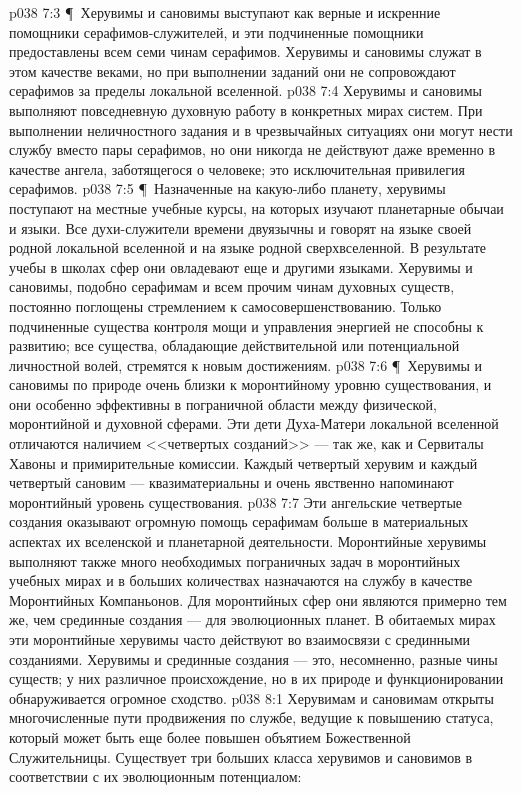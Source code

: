 \vs p038 7:3 \P\ Херувимы и сановимы выступают как верные и искренние помощники серафимов\hyp{}служителей, и эти подчиненные помощники предоставлены всем семи чинам серафимов. Херувимы и сановимы служат в этом качестве веками, но при выполнении заданий они не сопровождают серафимов за пределы локальной вселенной.
\vs p038 7:4 Херувимы и сановимы выполняют повседневную духовную работу в конкретных мирах систем. При выполнении неличностного задания и в чрезвычайных ситуациях они могут нести службу вместо пары серафимов, но они никогда не действуют даже временно в качестве ангела, заботящегося о человеке; это исключительная привилегия серафимов.
\vs p038 7:5 \P\ Назначенные на какую\hyp{}либо планету, херувимы поступают на местные учебные курсы, на которых изучают планетарные обычаи и языки. Все духи\hyp{}служители времени двуязычны и говорят на языке своей родной локальной вселенной и на языке родной сверхвселенной. В результате учебы в школах сфер они овладевают еще и другими языками. Херувимы и сановимы, подобно серафимам и всем прочим чинам духовных существ, постоянно поглощены стремлением к самосовершенствованию. Только подчиненные существа контроля мощи и управления энергией не способны к развитию; все существа, обладающие действительной или потенциальной личностной волей, стремятся к новым достижениям.
\vs p038 7:6 \P\ Херувимы и сановимы по природе очень близки к моронтийному уровню существования, и они особенно эффективны в пограничной области между физической, моронтийной и духовной сферами. Эти дети Духа\hyp{}Матери локальной вселенной отличаются наличием <<четвертых созданий>> --- так же, как и Сервиталы Хавоны и примирительные комиссии. Каждый четвертый херувим и каждый четвертый сановим --- квазиматериальны и очень явственно напоминают моронтийный уровень существования.
\vs p038 7:7 Эти ангельские четвертые создания оказывают огромную помощь серафимам больше в материальных аспектах их вселенской и планетарной деятельности. Моронтийные херувимы выполняют также много необходимых пограничных задач в моронтийных учебных мирах и в больших количествах назначаются на службу в качестве Моронтийных Компаньонов. Для моронтийных сфер они являются примерно тем же, чем срединные создания --- для эволюционных планет. В обитаемых мирах эти моронтийные херувимы часто действуют во взаимосвязи с срединными созданиями. Херувимы и срединные создания --- это, несомненно, разные чины существ; у них различное происхождение, но в их природе и функционировании обнаруживается огромное сходство.
\vs p038 8:1 Херувимам и сановимам открыты многочисленные пути продвижения по службе, ведущие к повышению статуса, который может быть еще более повышен объятием Божественной Служительницы. Существует три больших класса херувимов и сановимов в соответствии с их эволюционным потенциалом:
